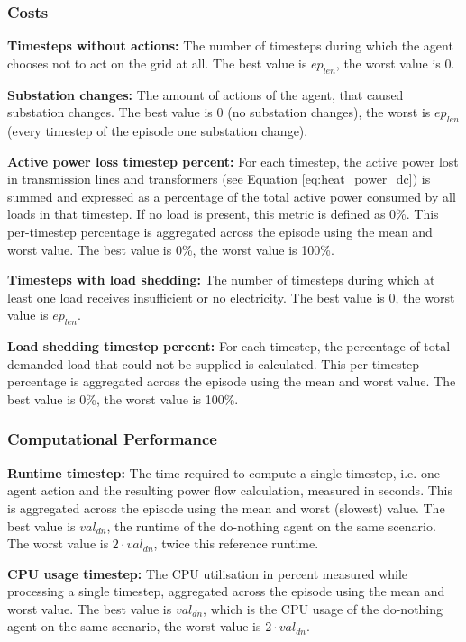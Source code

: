 \subsubsection{Costs}
\label{app:metrics_costs}

\textbf{Timesteps without actions:} The number of timesteps during which the agent chooses not to act on the grid at all. The best value is $ep_{len}$, the worst value is 0.

\textbf{Substation changes:} The amount of actions of the agent, that caused substation changes. The best value is 0 (no substation changes), the worst is $ep_{len}$ (every timestep of the episode one substation change).

\textbf{Active power loss timestep percent:} For each timestep, the active power lost in transmission lines and transformers (see Equation \eqref{eq:heat_power_dc}) is summed and expressed as a percentage of the total active power consumed by all loads in that timestep. If no load is present, this metric is defined as 0\%. This per-timestep percentage is aggregated across the episode using the mean and worst value. The best value is 0\%, the worst value is 100\%.

\textbf{Timesteps with load shedding:} The number of timesteps during which at least one load receives insufficient or no electricity. The best value is 0, the worst value is $ep_{len}$.

\textbf{Load shedding timestep percent:} For each timestep, the percentage of total demanded load that could not be supplied is calculated. This per-timestep percentage is aggregated across the episode using the mean and worst value. The best value is 0\%, the worst value is 100\%.


\subsubsection{Computational Performance}
\label{app:metrics_computational_performance}

\textbf{Runtime timestep:} The time required to compute a single timestep, i.e. one agent action and the resulting power flow calculation, measured in seconds. This is aggregated across the episode using the mean and worst (slowest) value. The best value is $val_{dn}$, the runtime of the do-nothing agent on the same scenario. The worst value is $2 \cdot val_{dn}$, twice this reference runtime.

\textbf{CPU usage timestep:} The CPU utilisation in percent measured while processing a single timestep, aggregated across the episode using the mean and worst value. The best value is $val_{dn}$, which is the CPU usage of the do-nothing agent on the same scenario, the worst value is $2 \cdot val_{dn}$.

